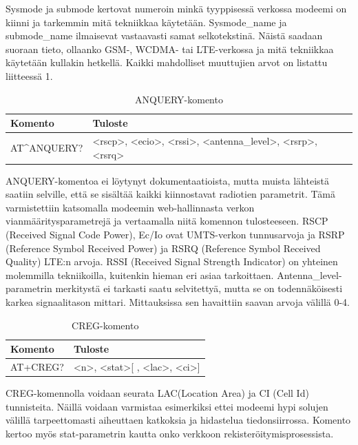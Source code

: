 \documentclass[11pt,a4paper,oneside,article,finnish]{memoir}
\begin{document}
Sysmode ja submode kertovat numeroin minkä tyyppisessä verkossa modeemi on kiinni ja tarkemmin mitä tekniikkaa käytetään. Sysmode\_name ja submode\_name ilmaisevat vastaavasti samat selkotekstinä. Näistä saadaan suoraan tieto, ollaanko GSM-, WCDMA- tai LTE-verkossa ja mitä tekniikkaa käytetään kullakin hetkellä. Kaikki mahdolliset muuttujien arvot on listattu liitteessä 1.
\begin{table}[H]
	\centering
	\caption{ANQUERY-komento}
	\begin{tabularx}{.95\textwidth}{|p{3cm}|X|}
		\hline
		Komento & Tuloste \\
    		\hline
		AT\^{}ANQUERY? & \textless rscp\textgreater , \textless ecio\textgreater , \textless rssi\textgreater , \textless antenna\_level\textgreater , \textless rsrp\textgreater , \textless rsrq\textgreater \\
		\hline
	\end{tabularx}
	\label{table:atkomento_anquery}
\end{table}
ANQUERY-komentoa ei löytynyt dokumentaatioista, mutta muista lähteistä saatiin selville, että se sisältää kaikki kiinnostavat radiotien parametrit. Tämä varmistettiin katsomalla modeemin web-hallinnasta verkon vianmääritysparametrejä ja vertaamalla niitä komennon tulosteeseen. RSCP (Received Signal Code Power), Ec/Io ovat UMTS-verkon tunnusarvoja ja RSRP (Reference Symbol Received Power) ja RSRQ (Reference Symbol Received Quality) LTE:n arvoja. RSSI (Received Signal Strength Indicator) on yhteinen molemmilla tekniikoilla, kuitenkin hieman eri asiaa tarkoittaen. Antenna\_level-parametrin merkitystä ei tarkasti saatu selvitettyä, mutta se on todennäköisesti karkea signaalitason mittari. Mittauksissa sen havaittiin saavan arvoja välillä 0-4.
\begin{table}[H]
	\centering
	\caption{CREG-komento}
	\begin{tabularx}{.95\textwidth}{|p{3cm}|X|}
		\hline
		Komento & Tuloste \\
    		\hline
		AT+CREG? & \textless n\textgreater , \textless stat\textgreater [ , \textless lac\textgreater , \textless ci\textgreater ] \\
		\hline
	\end{tabularx}
	\label{table:atkomento_creg}
\end{table}
CREG-komennolla voidaan seurata LAC(Location Area) ja CI (Cell Id) tunnisteita. Näillä voidaan varmistaa esimerkiksi ettei modeemi hypi solujen välillä tarpeettomasti aiheuttaen katkoksia ja hidastelua tiedonsiirrossa. Komento kertoo myös stat-parametrin kautta onko verkkoon rekisteröitymisprosessista.
\end{document}
